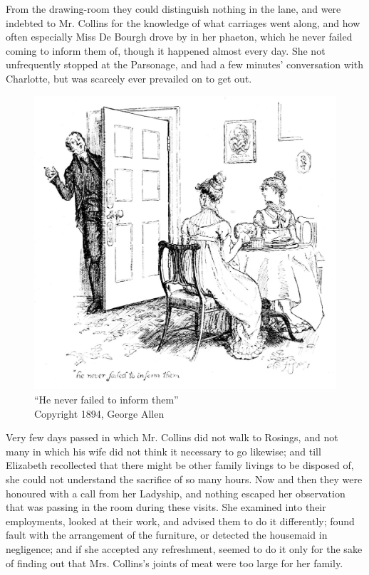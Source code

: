 From the drawing-room they could distinguish nothing in the lane, and were indebted to Mr. Collins for the knowledge of what carriages went along, and how often especially Miss De Bourgh drove by in her phaeton, which he never failed coming to inform them of, though it happened almost every day. She not unfrequently stopped at the Parsonage, and had a few minutes' conversation with Charlotte, but was scarcely ever prevailed on to get out.

\begin{figure}[htbp]
    \centering
    \includegraphics[width=\textwidth]{illustrations/i_240.jpg}
    \caption{“He never failed to inform them”\\ Copyright 1894, George Allen}
    \label{fig:image}
\end{figure}

Very few days passed in which Mr. Collins did not walk to Rosings, and not many in which his wife did not think it necessary to go likewise; and till Elizabeth recollected that there might be other family livings to be disposed of, she could not understand the sacrifice of so many hours. Now and then they were honoured with a call from her Ladyship, and nothing escaped her observation that was passing in the room during these visits. She examined into their employments, looked at their work, and advised them to do it differently; found fault with the arrangement of the furniture, or detected the housemaid in negligence; and if she accepted any refreshment, seemed to do it only for the sake of finding out that Mrs. Collins's joints of meat were too large for her family.

